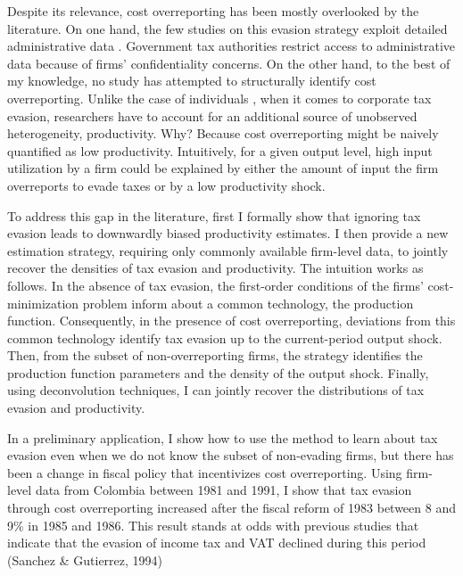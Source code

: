 \documentclass[
  12pt]{article}
\theoremstyle{definition}
\theoremstyle{remark}
\begin{document}
Despite its relevance, cost overreporting has been mostly overlooked by
the literature. On one hand, the few studies on this evasion strategy
exploit detailed administrative data \citep{Zumaya2021, Carrillo2022}.
Government tax authorities restrict access to administrative data
because of firms' confidentiality concerns. On the other hand, to the
best of my knowledge, no study has attempted to structurally identify
cost overreporting. Unlike the case of individuals
\citep{Pissarides1989, Paulus2015}, when it comes to corporate tax
evasion, researchers have to account for an additional source of
unobserved heterogeneity, productivity. Why? Because cost overreporting
might be naively quantified as low productivity. Intuitively, for a
given output level, high input utilization by a firm could be explained
by either the amount of input the firm overreports to evade taxes or by
a low productivity shock.

To address this gap in the literature, first I formally show that
ignoring tax evasion leads to downwardly biased productivity estimates.
I then provide a new estimation strategy, requiring only commonly
available firm-level data, to jointly recover the densities of tax
evasion and productivity. The intuition works as follows. In the absence
of tax evasion, the first-order conditions of the firms'
cost-minimization problem inform about a common technology, the
production function. Consequently, in the presence of cost
overreporting, deviations from this common technology identify tax
evasion up to the current-period output shock. Then, from the subset of
non-overreporting firms, the strategy identifies the production function
parameters and the density of the output shock. Finally, using
deconvolution techniques, I can jointly recover the distributions of tax
evasion and productivity.

In a preliminary application, I show how to use the method to learn
about tax evasion even when we do not know the subset of non-evading
firms, but there has been a change in fiscal policy that incentivizes
cost overreporting. Using firm-level data from Colombia between 1981 and
1991, I show that tax evasion through cost overreporting increased after
the fiscal reform of 1983 between 8 and 9\% in 1985 and 1986. This
result stands at odds with previous studies that indicate that the
evasion of income tax and VAT declined during this period (Sanchez \&
Gutierrez, 1994)
\end{document}
